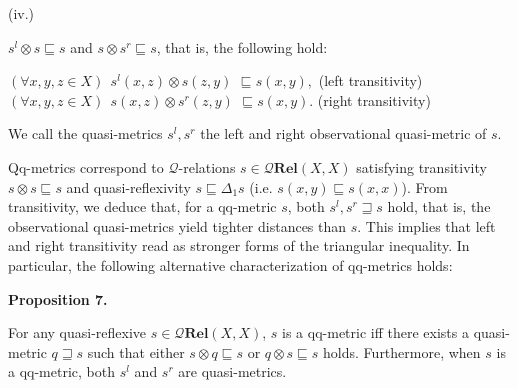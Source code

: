 \documentclass[10pt,a4paper]{amsart}
\begin{document}
 
 
\par\noindent  (iv.) 
 
$s^{l}\otimes s\sqsubseteq s$ and $s\otimes s^{r}\sqsubseteq s$, that is, the following hold:\par
 
 
     $\displaystyle(\forall x,y,z\in X)\ \ s^{l}(x,z)\otimes s(z,y)$ $\displaystyle\sqsubseteq s(x,y),$  (left transitivity)    $\displaystyle(\forall x,y,z\in X)\ \ s(x,z)\otimes s^{r}(z,y)$ $\displaystyle\sqsubseteq s(x,y).$  (right transitivity)   
 
 
 
We call the quasi-metrics $s^{l},s^{r}$ the left and right observational quasi-metric of $s$.\par
 
 
 
Qq-metrics correspond to $\mathcal{Q}$-relations $s\in\mathcal{Q}\mathbf{Rel}(X,X)$ satisfying transitivity $s\otimes s\sqsubseteq s$ and quasi-reflexivity $s\sqsubseteq\Delta_{1}s$ (i.e. $s(x,y)\sqsubseteq s(x,x)$). From transitivity, we deduce that, for a qq-metric $s$, both $s^{l},s^{r}\sqsupseteq s$ hold, that is, the observational quasi-metrics yield tighter distances than $s$. This implies that left and right transitivity read as stronger forms of the triangular inequality. In particular, the following alternative characterization of qq-metrics holds:\par
 
 
 
\par\medskip\noindent\textbf{Proposition 7.}\par
 
 
For any quasi-reflexive $s\in\mathcal{Q}\mathbf{Rel}(X,X)$, $s$ is a qq-metric iff there exists a quasi-metric $q\sqsupseteq s$ such that either $s\otimes q\sqsubseteq s$ or $q\otimes s\sqsubseteq s$ holds. Furthermore, when $s$ is a qq-metric, both $s^{l}$ and $s^{r}$ are quasi-metrics.\par
 
 
\end{document}
